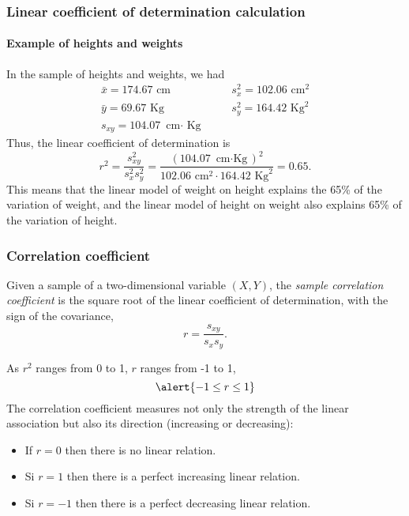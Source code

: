 \begin{frame}
\frametitle{Linear coefficient of determination calculation}
\framesubtitle{Example of heights and weights}
In the sample of heights and weights, we had
\[
\begin{array}{lll}
\bar x = 174.67 \mbox{ cm} & \quad & s^2_x = 102.06 \mbox{ cm}^2\\
\bar y = 69.67 \mbox{ Kg} & & s^2_y = 164.42 \mbox{ Kg}^2\\
s_{xy} = 104.07 \mbox{ cm$\cdot$ Kg}
\end{array}
\]
Thus, the linear coefficient of determination is 
\[
r^2 = \frac{s_{xy}^2}{s_x^2s_y^2} = \frac{(104.07 \mbox{ cm$\cdot$Kg})^2}{102.06 \mbox{ cm}^2 \cdot 164.42 \mbox{ Kg}^2} = 0.65.
\]
This means that the linear model of weight on height explains the 65\% of the variation of weight, and the linear model of height on weight also explains 65\% of the variation of height. 
\end{frame}


\begin{frame}
\frametitle{Correlation coefficient}
\begin{definition}
Given a sample of a two-dimensional variable $(X,Y)$, the \emph{sample correlation coefficient} is the square root of the linear coefficient of determination, with the sign of the covariance,
\[
r = \dfrac{s_{xy}}{s_xs_y}.
\]
\end{definition}
As $r^2$ ranges from 0 to 1, $r$  ranges from -1 to 1,
\[
\alert{-1\leq r\leq 1}
\]
The correlation coefficient measures not only the strength of the linear association but also its direction (increasing or decreasing):
\begin{itemize}
\item If $r=0$ then there is no linear relation.
\item Si $r=1$ then there is a perfect increasing linear relation.
\item Si $r=-1$ then there is a perfect decreasing linear relation.
\end{itemize}
\end{frame}


